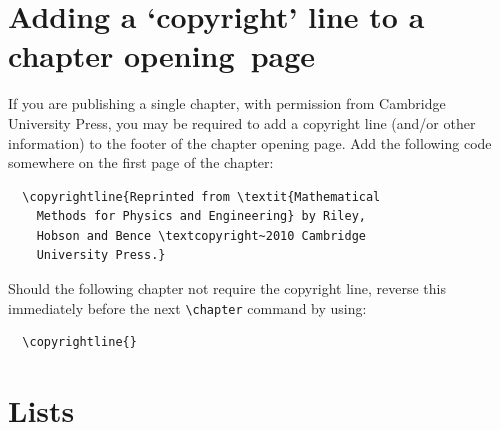 \section{Adding a `copyright' line to a chapter opening~page}
If you are publishing a single chapter, with permission from Cambridge University Press, you may be required to add a copyright line (and/or other information) to the footer of the chapter opening page. Add the following code somewhere on the first page of the chapter:
\begin{verbatim}
  \copyrightline{Reprinted from \textit{Mathematical
    Methods for Physics and Engineering} by Riley,
    Hobson and Bence \textcopyright~2010 Cambridge
    University Press.}
\end{verbatim}
Should the following chapter not require the copyright line, reverse this immediately before the next \verb"\chapter" command by using:
\begin{verbatim}
  \copyrightline{}
\end{verbatim}

\section{Lists}
\label{lists}

